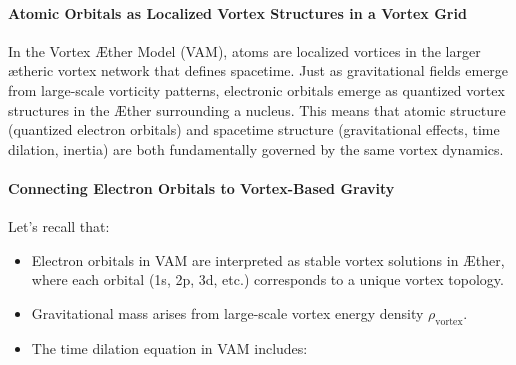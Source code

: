 \documentclass[a4paper,10pt]{article}
\begin{document}
\paragraph{Atomic Orbitals as Localized Vortex Structures in a Vortex Grid}
In the Vortex Æther Model (VAM), atoms are localized vortices in the larger ætheric vortex network that defines spacetime.
Just as gravitational fields emerge from large-scale vorticity patterns, electronic orbitals emerge as quantized vortex structures in the Æther surrounding a nucleus.
This means that atomic structure (quantized electron orbitals) and spacetime structure (gravitational effects, time dilation, inertia) are both fundamentally governed by the same vortex dynamics.

\paragraph{Connecting Electron Orbitals to Vortex-Based Gravity}
Let's recall that:
\begin{itemize}
    \item Electron orbitals in VAM are interpreted as stable vortex solutions in Æther, where each orbital (1s, 2p, 3d, etc.) corresponds to a unique vortex topology.
    \item Gravitational mass arises from large-scale vortex energy density $\rho_\text{vortex}$.
    \item The time dilation equation in VAM includes:
\end{itemize}
\end{document}
